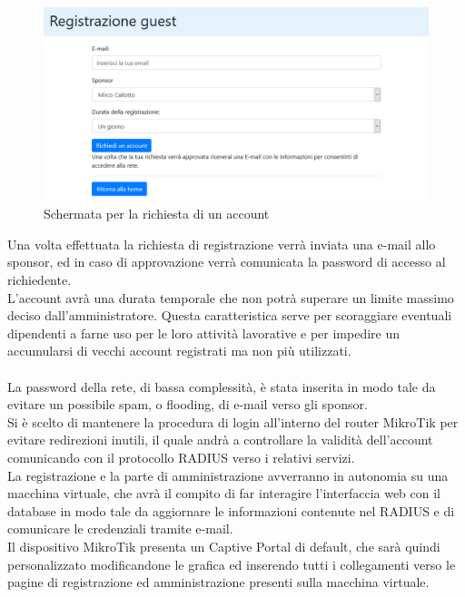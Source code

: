 \documentclass[Realizzazione.tex]{subfiles}
\begin{document}
\begin{figure}[H]
	\centering
	\includegraphics[width=1.1\linewidth]{"images/CaptivePortalReq"}
	\caption{Schermata per la richiesta di un account}
	\label{fig:Schermata per la richiesta di un account}
\end{figure}

Una volta effettuata la richiesta di registrazione verrà inviata una e-mail allo sponsor, ed in caso di approvazione verrà comunicata la password di accesso al richiedente. \\
L'account avrà una durata temporale che non potrà superare un limite massimo deciso dall'amministratore. Questa caratteristica serve per scoraggiare eventuali dipendenti a farne uso per le loro attività lavorative e per impedire un accumularsi di vecchi account registrati ma non più utilizzati. \\\\
La password della rete, di bassa complessità, è stata inserita in modo tale da evitare un possibile spam, o flooding, di e-mail verso gli sponsor. \\

Si è scelto di mantenere la procedura di login all'interno del router MikroTik per evitare redirezioni inutili, il quale andrà a controllare la validità dell'account comunicando con il protocollo RADIUS verso i relativi servizi. \\
La registrazione e la parte di amministrazione avverranno in autonomia su una macchina virtuale, che avrà il compito di far interagire l'interfaccia web con il database in modo tale da aggiornare le informazioni contenute nel RADIUS e di comunicare le credenziali tramite e-mail. \\

Il dispositivo MikroTik presenta un Captive Portal di default, che sarà quindi personalizzato modificandone le grafica ed inserendo tutti i collegamenti verso le pagine di registrazione ed amministrazione presenti sulla macchina virtuale. \\
\end{document}
